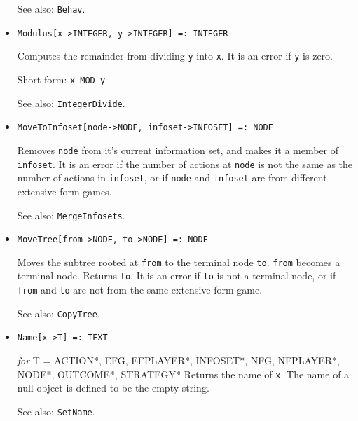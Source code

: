 \begin{itemize}
{\it for} {\tt T = FLOAT, RATIONAL}
\bd
Converts \verb+profile+ to the equivalent mixed strategy profile on the
associated normal form game.  It is an error if there is no associated
normal form game.
\item [See also:] \verb+Behav+.
\ed

\item
\protect \large \begin{verbatim}
Modulus[x->INTEGER, y->INTEGER] =: INTEGER
\end{verbatim}\normalsize

\bd
Computes the remainder from dividing \verb+y+ into \verb+x+.  It is an
error if \verb+y+ is zero.
\item [Short form:] \verb+x MOD y+
\item [See also:] \verb+IntegerDivide+.
\ed


\item
\protect \large \begin{verbatim}
MoveToInfoset[node->NODE, infoset->INFOSET] =: NODE
\end{verbatim}\normalsize

\bd
Removes \verb+node+ from it's current information set, and makes it a
member of \verb+infoset+. It is an error if the number of actions at
\verb+node+ is not the same as the number of actions in
\verb+infoset+, or if \verb+node+ and \verb+infoset+ are from
different extensive form games.   
\item [See also:] \verb+MergeInfosets+.
\ed


\item
\protect \large \begin{verbatim}
MoveTree[from->NODE, to->NODE] =: NODE
\end{verbatim}\normalsize

\bd
Moves the subtree rooted at \verb+from+ to
the terminal node \verb+to+.  \verb+from+ becomes a terminal node.
Returns \verb+to+.  It is an error if \verb+to+ is not a terminal
node, or if \verb+from+ and \verb+to+ are not from the same extensive
form game.
\item [See also:] \verb+CopyTree+.
\ed


\item
\protect \large \begin{verbatim}
Name[x->T] =: TEXT
\end{verbatim}\normalsize

{\it for} {T = ACTION*, EFG, EFPLAYER*, INFOSET*, NFG, NFPLAYER*,
NODE*, OUTCOME*, STRATEGY*} 
\bd
Returns the name of \verb+x+.  The name of a null object is defined
to be the empty string.
\item
[See also:] \verb+SetName+.
\ed


\end{itemize}
